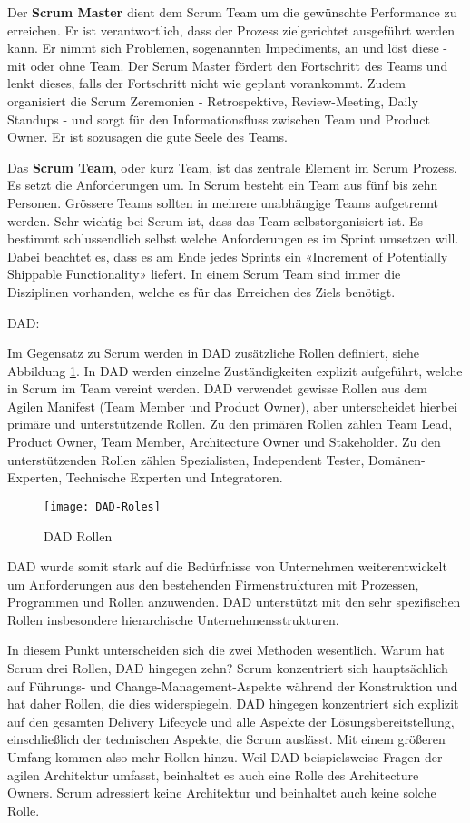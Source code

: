 Der \textbf{Scrum Master} dient dem Scrum Team um die gewünschte Performance zu erreichen. Er ist verantwortlich, dass der Prozess zielgerichtet ausgeführt werden kann. Er nimmt sich Problemen, sogenannten Impediments, an und löst diese - mit oder ohne Team. Der Scrum Master fördert den Fortschritt des Teams und lenkt dieses, falls der Fortschritt nicht wie geplant vorankommt. Zudem organisiert die Scrum Zeremonien - Retrospektive, Review-Meeting, Daily Standups - und sorgt für den Informationsfluss zwischen Team und Product Owner. Er ist sozusagen die gute Seele des Teams. \medskip

Das \textbf{Scrum Team}, oder kurz Team, ist das zentrale Element im Scrum Prozess. Es setzt die Anforderungen um. In Scrum besteht ein Team aus fünf bis zehn Personen. Grössere Teams sollten in mehrere unabhängige Teams aufgetrennt werden. Sehr wichtig bei Scrum ist, dass das Team selbstorganisiert ist. Es bestimmt schlussendlich selbst welche Anforderungen es im Sprint umsetzen will. Dabei beachtet es, dass es am Ende jedes Sprints ein «Increment of  Potentially Shippable Functionality» liefert. In einem Scrum Team sind immer die Disziplinen vorhanden, welche es für das Erreichen des Ziels benötigt.
\bigskip

{\Large DAD:} \cite{dadRoles} \medskip

Im Gegensatz zu Scrum werden in DAD zusätzliche Rollen definiert, siehe Abbildung \ref{fig:dadrollen}. In DAD werden einzelne Zuständigkeiten explizit aufgeführt, welche in Scrum im Team vereint werden. DAD verwendet gewisse Rollen aus dem Agilen Manifest (Team Member und Product Owner), aber unterscheidet hierbei primäre und unterstützende Rollen. Zu den primären Rollen zählen Team Lead, Product Owner, Team Member, Architecture Owner und Stakeholder. Zu den unterstützenden Rollen zählen Spezialisten, Independent Tester, Domänen-Experten, Technische Experten und Integratoren.

\begin{figure}[H]
	\centering
	\texttt{[image: DAD-Roles]}
	\caption{DAD Rollen \cite{dadRoles}}
	\label{fig:dadrollen}
\end{figure}

DAD wurde somit stark auf die Bedürfnisse von Unternehmen weiterentwickelt um Anforderungen aus den bestehenden Firmenstrukturen mit Prozessen, Programmen und Rollen anzuwenden. DAD unterstützt mit den sehr spezifischen Rollen insbesondere hierarchische Unternehmensstrukturen.
\bigskip


In diesem Punkt unterscheiden sich die zwei Methoden wesentlich. Warum hat Scrum drei Rollen, DAD hingegen zehn? Scrum konzentriert sich hauptsächlich auf Führungs- und Change-Management-Aspekte während der Konstruktion und hat daher Rollen, die dies widerspiegeln. DAD hingegen konzentriert sich explizit auf den gesamten Delivery Lifecycle und alle Aspekte der Lösungsbereitstellung, einschließlich der technischen Aspekte, die Scrum auslässt. Mit einem größeren Umfang kommen also mehr Rollen hinzu. Weil DAD beispielsweise Fragen der agilen Architektur umfasst, beinhaltet es auch eine Rolle des Architecture Owners. Scrum adressiert keine Architektur und beinhaltet auch keine solche Rolle.

